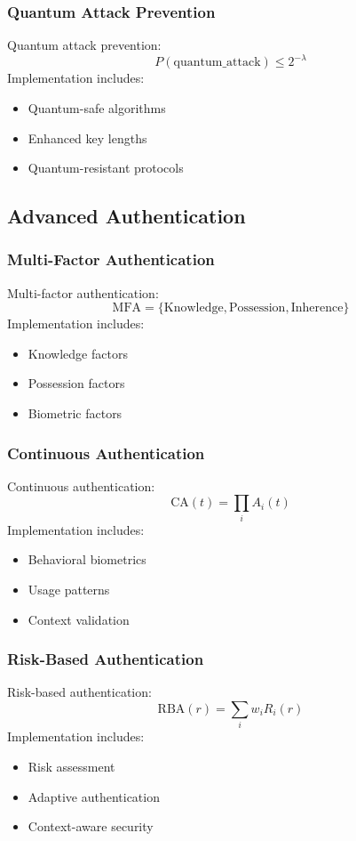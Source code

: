 \documentclass[12pt]{article}
\begin{document}
\subsubsection{Quantum Attack Prevention}
Quantum attack prevention:
\begin{equation}
P(\text{quantum\_attack}) \leq 2^{-\lambda}
\end{equation}
Implementation includes:
\begin{itemize}
\item Quantum-safe algorithms
\item Enhanced key lengths
\item Quantum-resistant protocols
\end{itemize}
\subsection{Advanced Authentication}
\subsubsection{Multi-Factor Authentication}
Multi-factor authentication:
\begin{equation}
\text{MFA} = \{\text{Knowledge}, \text{Possession}, \text{Inherence}\}
\end{equation}
Implementation includes:
\begin{itemize}
\item Knowledge factors
\item Possession factors
\item Biometric factors
\end{itemize}
\subsubsection{Continuous Authentication}
Continuous authentication:
\begin{equation}
\text{CA}(t) = \prod_i A_i(t)
\end{equation}
Implementation includes:
\begin{itemize}
\item Behavioral biometrics
\item Usage patterns
\item Context validation
\end{itemize}
\subsubsection{Risk-Based Authentication}
Risk-based authentication:
\begin{equation}
\text{RBA}(r) = \sum_i w_i R_i(r)
\end{equation}
Implementation includes:
\begin{itemize}
\item Risk assessment
\item Adaptive authentication
\item Context-aware security
\end{itemize}
\end{document}
